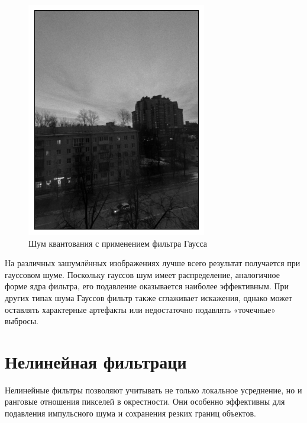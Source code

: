 \documentclass[a4paper,12pt]{article}
\begin{document}
\begin{figure}[H]
\begin{minipage}{0.49\textwidth}
        \centering \includegraphics[width=\textwidth]{results/lpf_pois_5.png}
        \caption{Шум квантования с применением фильтра Гаусса}
    \end{minipage}
\end{figure}
\noindent
На различных зашумлённых изображениях лучше всего результат получается при гауссовом шуме. Поскольку гауссов шум имеет распределение, аналогичное форме ядра фильтра, его подавление оказывается наиболее эффективным. При других типах шума Гауссов фильтр также сглаживает искажения, однако может оставлять характерные артефакты или недостаточно подавлять «точечные» выбросы.

\section{Нелинейная фильтраци}
Нелинейные фильтры позволяют учитывать не только локальное усреднение, но и ранговые отношения пикселей в окрестности. Они особенно эффективны для подавления импульсного шума и сохранения резких границ объектов.
\end{document}
